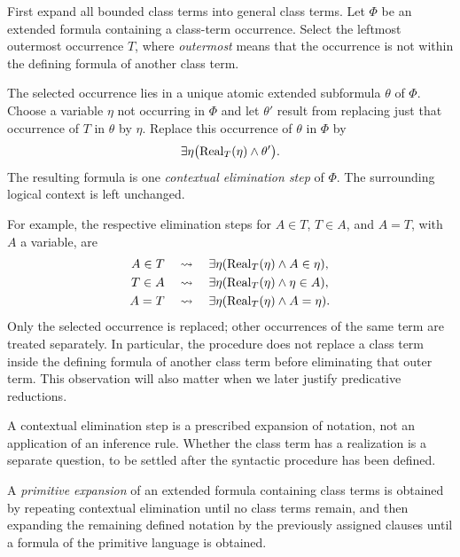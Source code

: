 \begin{definition}
\label{def:contextual-elimination}
First expand all bounded class terms into general class terms. Let
\(\Phi\) be an extended formula containing a class-term occurrence.
Select the leftmost outermost occurrence \(T\), where
\emph{outermost} means that the occurrence is not within the
defining formula of another class term.

The selected occurrence lies in a unique atomic extended subformula
\(\theta\) of \(\Phi\). Choose a variable \(\eta\) not occurring in
\(\Phi\) and let \(\theta'\) result from replacing just that
occurrence of \(T\) in \(\theta\) by \(\eta\).
Replace this occurrence of \(\theta\) in \(\Phi\) by
\[
\exists\eta\bigl(
\operatorname{Real}_T(\eta)\land\theta'
\bigr).
\]
The resulting formula is one \emph{contextual elimination step} of
\(\Phi\). The surrounding logical context is left unchanged.
\end{definition}

For example, the respective elimination steps for
\(A\in T\), \(T\in A\), and \(A=T\), with \(A\) a variable, are
\[
\begin{aligned}
A\in T
&\quad\rightsquigarrow\quad
\exists\eta(\operatorname{Real}_T(\eta)\land A\in\eta),\\
T\in A
&\quad\rightsquigarrow\quad
\exists\eta(\operatorname{Real}_T(\eta)\land\eta\in A),\\
A=T
&\quad\rightsquigarrow\quad
\exists\eta(\operatorname{Real}_T(\eta)\land A=\eta).
\end{aligned}
\]
Only the selected occurrence is replaced; other occurrences of the
same term are treated separately. In particular, the procedure does
not replace a class term inside the defining formula of another
class term before eliminating that outer term. This observation will
also matter when we later justify predicative reductions.

A contextual elimination step is a prescribed expansion of notation,
not an application of an inference rule. Whether the class term has a
realization is a separate question, to be settled after the syntactic
procedure has been defined.


\begin{definition}
\label{def:primitive-expansion-with-class-terms}
A \emph{primitive expansion} of an extended formula containing class
terms is obtained by repeating contextual elimination until no class
terms remain, and then expanding the remaining defined notation by
the previously assigned clauses until a formula of the primitive
language is obtained.
\end{definition}

